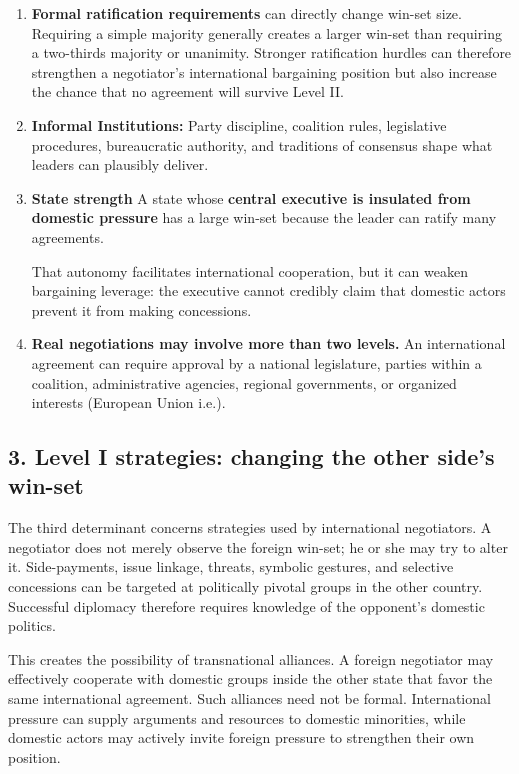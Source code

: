 \begin{enumerate}
    \item \textbf{Formal ratification requirements} can directly change win-set size. Requiring a simple majority generally creates a larger win-set than requiring a two-thirds majority or unanimity. Stronger ratification hurdles can therefore strengthen a negotiator's international bargaining position but also increase the chance that no agreement will survive Level II.
    \item \textbf{Informal Institutions:} Party discipline, coalition rules, legislative procedures, bureaucratic authority, and traditions of consensus shape what leaders can plausibly deliver.
    \item \textbf{State strength} A state whose \textbf{central executive is insulated from domestic pressure} has a large win-set because the leader can ratify many agreements.
    
    That autonomy facilitates international cooperation, but it can weaken bargaining leverage: the executive cannot credibly claim that domestic actors prevent it from making concessions.
    \item \textbf{Real negotiations may involve more than two levels.} An international agreement can require approval by a national legislature, parties within a coalition, administrative agencies, regional governments, or organized interests (European Union i.e.).
\end{enumerate}

\subsection{3. Level I strategies: changing the other side's win-set}

The third determinant concerns strategies used by international negotiators. A negotiator does not merely observe the foreign win-set; he or she may try to alter it. Side-payments, issue linkage, threats, symbolic gestures, and selective concessions can be targeted at politically pivotal groups in the other country. Successful diplomacy therefore requires knowledge of the opponent's domestic politics.

This creates the possibility of transnational alliances. A foreign negotiator may effectively cooperate with domestic groups inside the other state that favor the same international agreement. Such alliances need not be formal. International pressure can supply arguments and resources to domestic minorities, while domestic actors may actively invite foreign pressure to strengthen their own position.


